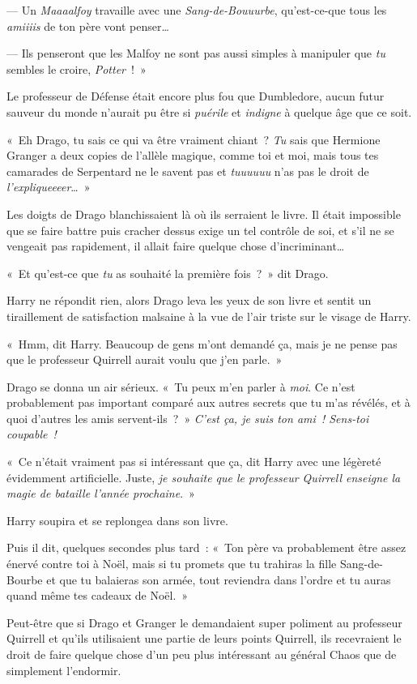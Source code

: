 --- Un \emph{Maaaalfoy} travaille avec une \emph{Sang-de-Bouuurbe}, qu'est-ce-que tous les \emph{amiiiis} de ton père vont penser…

--- Ils penseront que les Malfoy ne sont pas aussi simples à manipuler que \emph{tu} sembles le croire, \emph{Potter}~!~»

Le professeur de Défense était encore plus fou que Dumbledore, aucun futur sauveur du monde n'aurait pu être si \emph{puérile} et \emph{indigne} à quelque âge que ce soit.

«~Eh Drago, tu sais ce qui va être vraiment chiant~? \emph{Tu} sais que Hermione Granger a deux copies de l'allèle magique, comme toi et moi, mais tous tes camarades de Serpentard ne le savent pas et \emph{tuuuuuu} n'as pas le droit de \emph{l'expliqueeeer}…~»

Les doigts de Drago blanchissaient là où ils serraient le livre. Il était impossible que se faire battre puis cracher dessus exige un tel contrôle de soi, et s'il ne se vengeait pas rapidement, il allait faire quelque chose d'incriminant…

«~Et qu'est-ce que \emph{tu} as souhaité la première fois~?~» dit Drago.

Harry ne répondit rien, alors Drago leva les yeux de son livre et sentit un tiraillement de satisfaction malsaine à la vue de l'air triste sur le visage de Harry.

«~Hmm, dit Harry. Beaucoup de gens m'ont demandé ça, mais je ne pense pas que le professeur Quirrell aurait voulu que j'en parle.~»

Drago se donna un air sérieux. «~Tu peux m'en parler à \emph{moi}. Ce n'est probablement pas important comparé aux autres secrets que tu m'as révélés, et à quoi d'autres les amis servent-ils~?~» \emph{C'est ça, je suis ton ami~! Sens-toi coupable~!}

«~Ce n'était vraiment pas si intéressant que ça, dit Harry avec une légèreté évidemment artificielle. Juste, \emph{je souhaite que le professeur Quirrell enseigne la magie de bataille l'année prochaine}.~»

Harry soupira et se replongea dans son livre.

Puis il dit, quelques secondes plus tard~: «~Ton père va probablement être assez énervé contre toi à Noël, mais si tu promets que tu trahiras la fille Sang-de-Bourbe et que tu balaieras son armée, tout reviendra dans l'ordre et tu auras quand même tes cadeaux de Noël.~»

Peut-être que si Drago et Granger le demandaient super poliment au professeur Quirrell et qu'ils utilisaient une partie de leurs points Quirrell, ils recevraient le droit de faire quelque chose d'un peu plus intéressant au général Chaos que de simplement l'endormir.~
